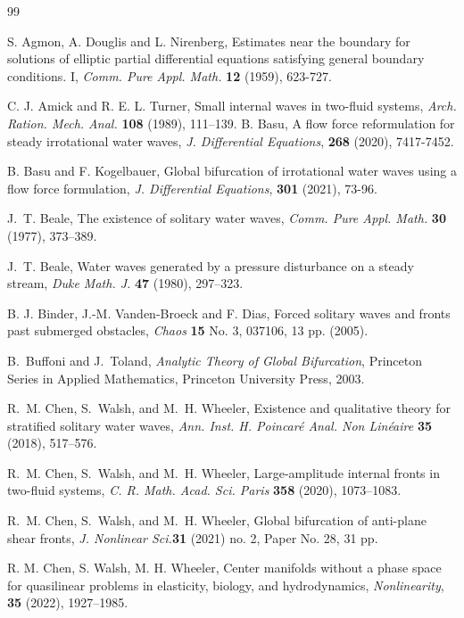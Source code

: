 \documentclass[12pt,letterpaper]{amsart}
\numberwithin{equation}{section}
\begin{document}
		
\begin{thebibliography}{99}		


 S. Agmon, A. Douglis and L. Nirenberg, Estimates near the boundary for solutions of elliptic partial
differential equations satisfying general boundary conditions. {I}, \emph{Comm. Pure Appl. Math.} \textbf{12} (1959), 623-727.


C. J. Amick and R. E. L. Turner, Small internal waves in two-fluid systems, \emph{Arch. Ration. Mech. Anal.} \textbf{108} (1989), 111--139.
 B. Basu, A flow force reformulation for steady irrotational water waves,
\emph{J. Differential Equations}, \textbf{268} (2020), 7417-7452.

 B. Basu and F. Kogelbauer, Global bifurcation of irrotational water waves using a flow force formulation,
\emph{J. Differential Equations}, \textbf{301} (2021), 73-96.


J.~T. Beale,
The existence of solitary water waves,
\emph{Comm. Pure Appl. Math.} \textbf{30} (1977), 373--389.

J.~T. Beale,
Water waves generated by a pressure disturbance on a steady stream,
\emph{Duke Math. J.} \textbf{47} (1980), 297--323.



B. J. Binder,  J.-M. Vanden-Broeck and F. Dias, Forced solitary waves and fronts past submerged obstacles, \emph{Chaos} \textbf{15} No. 3, 037106, 13 pp. (2005).

B.~Buffoni and J.~Toland,
\emph{Analytic Theory of Global Bifurcation},
Princeton Series in Applied Mathematics, Princeton University Press, 2003.


R.~M. Chen, S.~Walsh, and M.~H. Wheeler,
Existence and qualitative theory for stratified solitary water waves,
\emph{Ann. Inst. H. Poincar\'e Anal. Non Lin\'eaire} \textbf{35} (2018),
517--576.

R.~M. Chen, S.~Walsh, and M.~H. Wheeler, Large-amplitude internal fronts in two-fluid systems, \emph{C. R. Math. Acad. Sci. Paris} \textbf{358} (2020), 1073--1083.

R.~M. Chen, S.~Walsh, and M.~H. Wheeler,
Global bifurcation of anti-plane shear fronts, \emph{J. Nonlinear Sci.}\textbf{31} (2021) no. 2, Paper No. 28, 31 pp.

 R. M. Chen, S. Walsh, M. H. Wheeler, Center manifolds without a phase space for quasilinear
problems in elasticity, biology, and hydrodynamics, \emph{Nonlinearity}, \textbf{35} (2022), 1927–1985.



\end{thebibliography}
\end{document}
